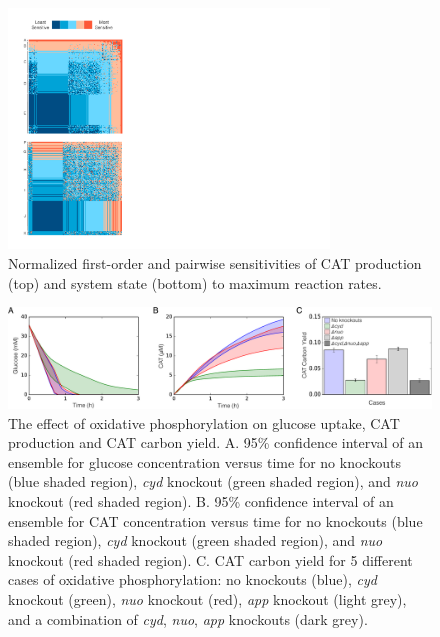 \documentclass[12pt]{article}
\begin{document}
\begin{figure}[ht]
\centering
\includegraphics[width=0.76\textwidth,trim=0 28 615 40,clip]{./Figures/Sensitivity.pdf}
\caption{Normalized first-order and pairwise sensitivities of CAT production (top) and system state (bottom) to maximum reaction rates.}
\label{fig:Sensitivity}
\end{figure}

\begin{figure}[ht]
\centering
\includegraphics[width=1\textwidth]{./Figures/oxphos_ko.pdf}
\caption{The effect of oxidative phosphorylation on glucose uptake, CAT production and CAT carbon yield. A. 95\% confidence interval of an ensemble for glucose concentration versus time for no knockouts (blue shaded region), \textit{cyd} knockout (green shaded region), and \textit{nuo} knockout (red shaded region). B. 95\% confidence interval of an ensemble for CAT concentration versus time for no knockouts (blue shaded region), \textit{cyd} knockout (green shaded region), and \textit{nuo} knockout (red shaded region). C. CAT carbon yield for 5 different cases of oxidative phosphorylation: no knockouts (blue), \textit{cyd} knockout (green), \textit{nuo} knockout (red), \textit{app} knockout (light grey), and a combination of \textit{cyd}, \textit{nuo}, \textit{app} knockouts (dark grey).}
\label{fig:oxphos_ko}
\end{figure}
\clearpage
\end{document}
